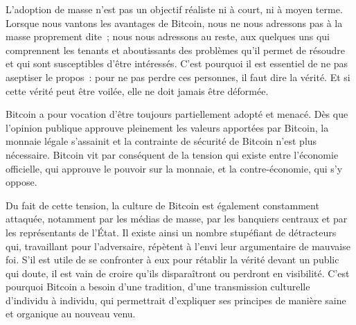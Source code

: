 L'adoption de masse n'est pas un objectif réaliste ni à court, ni à moyen terme. Lorsque nous vantons les avantages de Bitcoin, nous ne nous adressons pas à la masse proprement dite~; nous nous adressons au reste, aux quelques uns qui comprennent les tenants et aboutissants des problèmes qu'il permet de résoudre et qui sont susceptibles d'être intéressés. C'est pourquoi il est essentiel de ne pas aseptiser le propos~: pour ne pas perdre ces personnes, il faut dire la vérité. Et si cette vérité peut être voilée, elle ne doit jamais être déformée. %

Bitcoin a pour vocation d'être toujours partiellement adopté et menacé. Dès que l'opinion publique approuve pleinement les valeurs apportées par Bitcoin, la monnaie légale s'assainit et la contrainte de sécurité de Bitcoin n'est plus nécessaire. Bitcoin vit par conséquent de la tension qui existe entre l'économie officielle, qui approuve le pouvoir sur la monnaie, et la contre-économie, qui s'y oppose.

Du fait de cette tension, la culture de Bitcoin est également constamment attaquée, notamment par les médias de masse, par les banquiers centraux et par les représentants de l'État. Il existe ainsi un nombre stupéfiant de détracteurs qui, travaillant pour l'adversaire, répètent à l'envi leur argumentaire de mauvaise foi. S'il est utile de se confronter à eux pour rétablir la vérité devant un public qui doute, il est vain de croire qu'ils disparaîtront ou perdront en visibilité. C'est pourquoi Bitcoin a besoin d'une tradition, d'une transmission culturelle d'individu à individu, qui permettrait d'expliquer ses principes de manière saine et organique au nouveau venu. %

